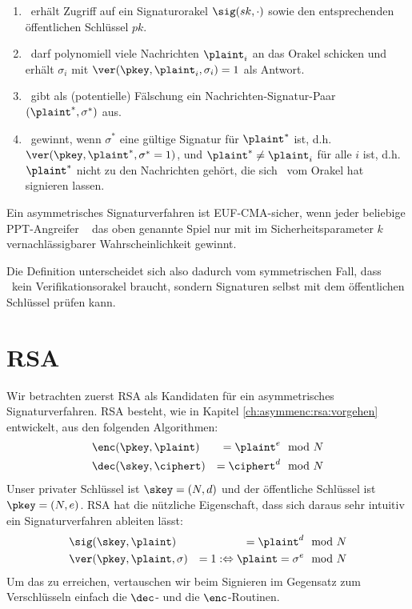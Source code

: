 \begin{definition}
\begin{enumerate}
\item \A~erhält Zugriff auf ein Signaturorakel $\sig(sk, \cdot)$ sowie den
  entsprechenden öffentlichen Schlüssel $pk$.
\item \A~darf polynomiell viele Nachrichten $\plaint_i$ an das
  Orakel schicken und erhält $\sigma_i$ mit $\ver(\pkey, \plaint_i, \sigma_i)=1$ als Antwort.
\item \A~gibt als (potentielle) Fälschung ein Nachrichten-Signatur-Paar
  $(\plaint^*,\sigma^*)$ aus.
\item \A~gewinnt, wenn $\sigma^*$ eine gültige Signatur für
  $\plaint^*$ ist, d.h. $\ver(\pkey, \plaint^*, \sigma^* = 1)$, und $\plaint^*
  \neq \plaint_i$ für alle $i$ ist, d.h. $\plaint^*$ nicht zu den
  Nachrichten gehört, die sich \A~vom Orakel hat signieren lassen.
\end{enumerate} 

Ein asymmetrisches Signaturverfahren ist EUF-CMA-sicher, wenn jeder
beliebige PPT-Angreifer \A~ das oben genannte Spiel nur mit im
Sicherheitsparameter $k$ vernachlässigbarer Wahrscheinlichkeit gewinnt. 
\end{definition}

Die Definition unterscheidet sich also dadurch vom symmetrischen Fall,
dass \A~kein Verifikationsorakel braucht, sondern Signaturen selbst mit
dem öffentlichen Schlüssel prüfen kann.

\section{RSA}
Wir betrachten zuerst RSA als Kandidaten für ein asymmetrisches Signaturverfahren. RSA besteht, wie in Kapitel \ref{ch:asymmenc:rsa:vorgehen} entwickelt,
aus den folgenden Algorithmen:
\begin{alignat*}{2}
& \enc(\pkey, \plaint) &= \plaint^e & \mod N\\
& \dec(\skey, \ciphert) &= \ciphert^d  & \mod N
\end{alignat*}
Unser privater Schlüssel ist $\skey = (N, d)$ und der öffentliche
Schlüssel ist $\pkey = (N, e)$. RSA hat die nützliche Eigenschaft, dass
sich daraus sehr intuitiv ein Signaturverfahren ableiten lässt:
\begin{alignat*}{2}
& \sig(\skey, \plaint) &= \plaint^d & \mod N\\
& \ver(\pkey, \plaint, \sigma) &= 1 : \Leftrightarrow \plaint = \sigma^e
& \mod N 
\end{alignat*}
Um das zu erreichen, vertauschen wir beim Signieren im Gegensatz zum Verschlüsseln einfach die $\dec$- und die $\enc$-Routinen.

